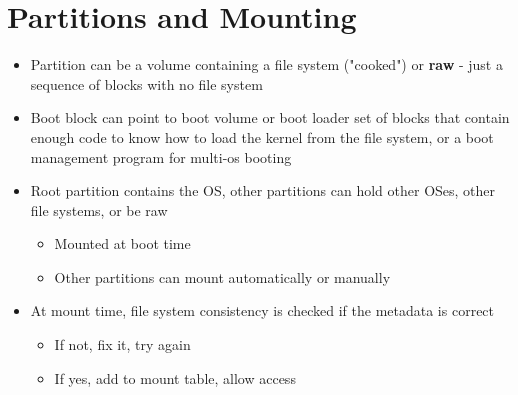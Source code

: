 \documentclass{article}[18pt]
\begin{document}
\section{Partitions and Mounting}
\begin{itemize}
	\item Partition can be a volume containing a file system ("cooked") or \textbf{raw} - just a sequence of blocks with no file system
	\item Boot block can point to boot volume or boot loader set of blocks that contain enough code to know how to load the kernel from the file system, or a boot management program for multi-os booting
	\item Root partition contains the OS, other partitions can hold other OSes, other file systems, or be raw
	\begin{itemize}
		\item Mounted at boot time
		\item Other partitions can mount automatically or manually
	\end{itemize} 
	\item At mount time, file system consistency is checked if the metadata is correct
	\begin{itemize}
		\item If not, fix it, try again
		\item If yes, add to mount table, allow access
	\end{itemize}
\end{itemize}
\end{document}
